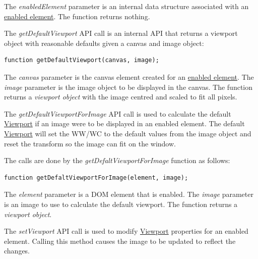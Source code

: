\documentclass{tufte-book} %
\begin{document}
\hfill

The \textit{enabledElement} parameter is an internal data structure associated with an \href{https://github.com/cornerstonejs/cornerstone/wiki/enabled-element}{enabled element}. The function returns nothing.

\hfill

The \textit{getDefaultViewport} API call is an internal API that returns a viewport object with reasonable defaults given a canvas and image object:

\hfill

\begin{lstlisting}
function getDefaultViewport(canvas, image);
\end{lstlisting}

\hfill

The \textit{canvas} parameter is the canvas element created for an \href{https://github.com/cornerstonejs/cornerstone/wiki/enabled-element}{enabled element}. The \textit{image} parameter is the image object to be displayed in the canvas. The function returns a \textit{viewport object} with the image centred and scaled to fit all pixels.

\hfill

The \textit{getDefaultViewportForImage} API call is used to calculate the default \href{https://github.com/cornerstonejs/cornerstone/wiki/viewport}{Viewport} if an image were to be displayed in an enabled element. The default \href{https://github.com/cornerstonejs/cornerstone/wiki/viewport}{Viewport} will set the WW/WC to the default values from the image object and reset the transform so the image can fit on the window.

\hfill

The calls are done by the \textit{getDefaltViewportForImage} function as follows:

\hfill

\begin{lstlisting}
function getDefaltViewportForImage(element, image);
\end{lstlisting}

\hfill

The \textit{element} parameter is a DOM element that is enabled. The \textit{image} parameter is an image to use to calculate the default viewport. The function returns a \textit{viewport object}.

\hfill

The \textit{setViewport} API call is used to modify \href{https://github.com/cornerstonejs/cornerstone/wiki/viewport}{Viewport} properties for an enabled element. Calling this method causes the image to be updated to reflect the changes.
\end{document}
